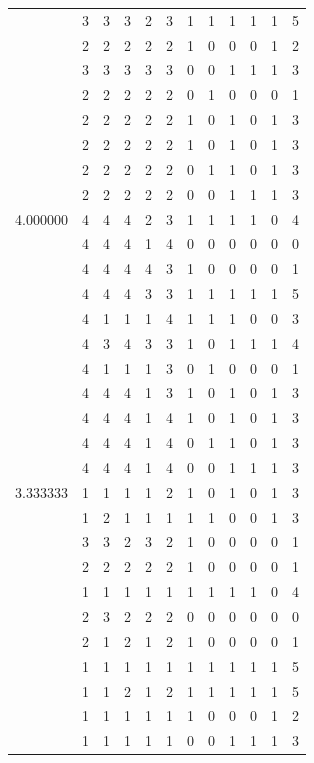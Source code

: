 \documentclass[]{book}
\theoremstyle{definition}
\theoremstyle{definition}
\theoremstyle{definition}
\theoremstyle{remark}
\begin{document}
\begin{table}
{\begin{tabular}[t]{rrrrrrrrrrrr}
 & 3 & 3 & 3 & 2 & 3 & 1 & 1 & 1 & 1 & 1 & 5\\
 & 2 & 2 & 2 & 2 & 2 & 1 & 0 & 0 & 0 & 1 & 2\\
 & 3 & 3 & 3 & 3 & 3 & 0 & 0 & 1 & 1 & 1 & 3\\
 & 2 & 2 & 2 & 2 & 2 & 0 & 1 & 0 & 0 & 0 & 1\\
 & 2 & 2 & 2 & 2 & 2 & 1 & 0 & 1 & 0 & 1 & 3\\
 & 2 & 2 & 2 & 2 & 2 & 1 & 0 & 1 & 0 & 1 & 3\\
 & 2 & 2 & 2 & 2 & 2 & 0 & 1 & 1 & 0 & 1 & 3\\
 & 2 & 2 & 2 & 2 & 2 & 0 & 0 & 1 & 1 & 1 & 3\\
4.000000 & 4 & 4 & 4 & 2 & 3 & 1 & 1 & 1 & 1 & 0 & 4\\
 & 4 & 4 & 4 & 1 & 4 & 0 & 0 & 0 & 0 & 0 & 0\\
 & 4 & 4 & 4 & 4 & 3 & 1 & 0 & 0 & 0 & 0 & 1\\
 & 4 & 4 & 4 & 3 & 3 & 1 & 1 & 1 & 1 & 1 & 5\\
 & 4 & 1 & 1 & 1 & 4 & 1 & 1 & 1 & 0 & 0 & 3\\
 & 4 & 3 & 4 & 3 & 3 & 1 & 0 & 1 & 1 & 1 & 4\\
 & 4 & 1 & 1 & 1 & 3 & 0 & 1 & 0 & 0 & 0 & 1\\
 & 4 & 4 & 4 & 1 & 3 & 1 & 0 & 1 & 0 & 1 & 3\\
 & 4 & 4 & 4 & 1 & 4 & 1 & 0 & 1 & 0 & 1 & 3\\
 & 4 & 4 & 4 & 1 & 4 & 0 & 1 & 1 & 0 & 1 & 3\\
 & 4 & 4 & 4 & 1 & 4 & 0 & 0 & 1 & 1 & 1 & 3\\
3.333333 & 1 & 1 & 1 & 1 & 2 & 1 & 0 & 1 & 0 & 1 & 3\\
 & 1 & 2 & 1 & 1 & 1 & 1 & 1 & 0 & 0 & 1 & 3\\
 & 3 & 3 & 2 & 3 & 2 & 1 & 0 & 0 & 0 & 0 & 1\\
 & 2 & 2 & 2 & 2 & 2 & 1 & 0 & 0 & 0 & 0 & 1\\
 & 1 & 1 & 1 & 1 & 1 & 1 & 1 & 1 & 1 & 0 & 4\\
 & 2 & 3 & 2 & 2 & 2 & 0 & 0 & 0 & 0 & 0 & 0\\
 & 2 & 1 & 2 & 1 & 2 & 1 & 0 & 0 & 0 & 0 & 1\\
 & 1 & 1 & 1 & 1 & 1 & 1 & 1 & 1 & 1 & 1 & 5\\
 & 1 & 1 & 2 & 1 & 2 & 1 & 1 & 1 & 1 & 1 & 5\\
 & 1 & 1 & 1 & 1 & 1 & 1 & 0 & 0 & 0 & 1 & 2\\
 & 1 & 1 & 1 & 1 & 1 & 0 & 0 & 1 & 1 & 1 & 3\\

\end{tabular}}
\end{table}
\end{document}
